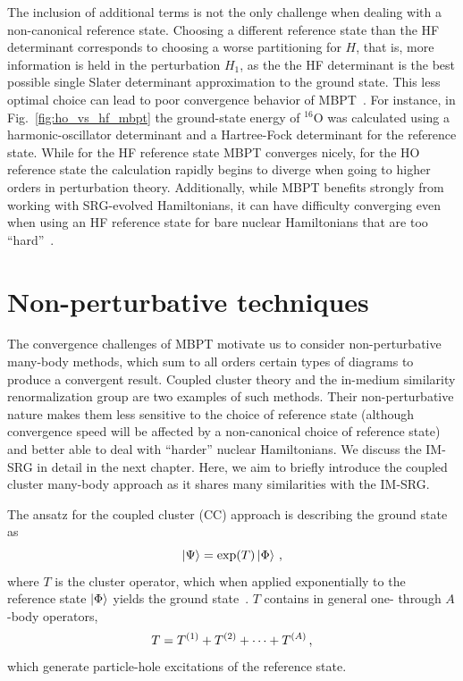 The inclusion of additional terms is not the only challenge when dealing with a non-canonical reference state.
Choosing a different reference state than the HF determinant
corresponds to choosing a worse partitioning for $H$,
that is, more information is held in the perturbation $H_1$,
as the the HF determinant is the best possible single Slater determinant approximation
to the ground state.
This less optimal choice can lead to poor convergence behavior of MBPT~\cite{Tich16hohfmbpt}.
For instance, in Fig.~\ref{fig:ho_vs_hf_mbpt}
the ground-state energy of ${}^{16}\text{O}$ was calculated
using a harmonic-oscillator determinant and a Hartree-Fock determinant
for the reference state.
While for the HF reference state MBPT converges nicely,
for the HO reference state the calculation rapidly begins to diverge
when going to higher orders in perturbation theory.
Additionally,
while MBPT benefits strongly from working with SRG-evolved Hamiltonians,
it can have difficulty converging even when using an HF reference state
for bare nuclear Hamiltonians that are too ``hard''~\cite{Tich20mbptreview}.

\section{Non-perturbative techniques}

The convergence challenges of MBPT motivate us to consider non-perturbative many-body methods,
which sum to all orders certain types of diagrams to produce a convergent result.
Coupled cluster theory and the in-medium similarity renormalization group
are two examples of such methods.
Their non-perturbative nature makes them less sensitive to the choice of reference state
(although convergence speed will be affected by a non-canonical choice of reference state)
and better able to deal with ``harder'' nuclear Hamiltonians.
We discuss the IM-SRG in detail in the next chapter.
Here, we aim to briefly introduce the coupled cluster many-body approach
as it shares many similarities with the IM-SRG.\@

The ansatz for the coupled cluster (CC) approach is describing the ground state as
\begin{equation}
  \ket{\Psi} = \exp(T)\ket{\Phi}\,,
\end{equation}
where $T$ is the cluster operator,
which when applied exponentially to the reference state $\ket{\Phi}$ yields the ground state~\cite{Hage13ccreview}.
$T$ contains in general one- through $A$-body operators,
\begin{equation}
  T = {T}^{(1)} + {T}^{(2)} + \cdots + {T}^{(A)}\,,
\end{equation}
which generate particle-hole excitations of the reference state.

